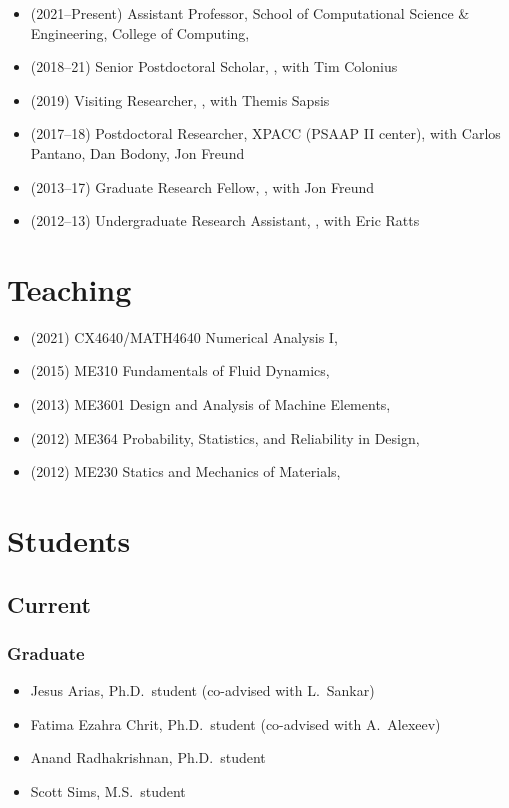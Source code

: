 \begin{itemize}
    \item (2021--Present) Assistant Professor, School of Computational Science \& Engineering, College of Computing, \GIT
    \item (2018--21) Senior Postdoctoral Scholar, \CIT, with Tim Colonius
    \item (2019) Visiting Researcher, \MIT, with Themis Sapsis
    \item (2017--18) Postdoctoral Researcher, XPACC (PSAAP II center), with Carlos Pantano, Dan Bodony, Jon Freund
    \item (2013--17) Graduate Research Fellow, \UIUC, with Jon Freund
    \item (2012--13) Undergraduate Research Assistant, \UMD, with Eric Ratts
\end{itemize}

\section{Teaching}

\begin{itemize}
    \item (2021) CX4640/MATH4640 Numerical Analysis I, \GIT
    \item (2015) ME310 Fundamentals of Fluid Dynamics, \UIUC
    \item (2013) ME3601 Design and Analysis of Machine Elements, \UMD
    \item (2012) ME364 Probability, Statistics, and Reliability in Design, \UMD
    \item (2012) ME230 Statics and Mechanics of Materials, \UMD
\end{itemize}


\section{Students}

\subsection{Current}

\subsubsection{Graduate}
\begin{itemize}
    \item Jesus Arias, Ph.D.\ student (co-advised with L.\ Sankar)
    \item Fatima Ezahra Chrit, Ph.D.\ student (co-advised with A.\ Alexeev)
    \item Anand Radhakrishnan, Ph.D.\ student
    \item Scott Sims, M.S.\ student
\end{itemize}


